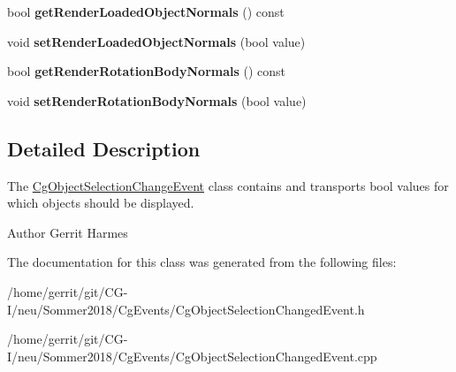\begin{DoxyCompactItemize}
\mbox{\label{class_cg_object_selection_change_event_ae0b775c52f0fb7b1be1d39e6885ac833}} 
bool {\bfseries get\+Render\+Loaded\+Object\+Normals} () const
\item 
\mbox{\label{class_cg_object_selection_change_event_a08680ed931d4d032c71e81939a16e4a6}} 
void {\bfseries set\+Render\+Loaded\+Object\+Normals} (bool value)
\item 
\mbox{\label{class_cg_object_selection_change_event_aadd3ceb647b0df2bf52c4f2b15d4e72c}} 
bool {\bfseries get\+Render\+Rotation\+Body\+Normals} () const
\item 
\mbox{\label{class_cg_object_selection_change_event_afb970c7b54889d6f41c82bd687fbc6fe}} 
void {\bfseries set\+Render\+Rotation\+Body\+Normals} (bool value)
\end{DoxyCompactItemize}


\subsection{Detailed Description}
The \hyperlink{class_cg_object_selection_change_event}{Cg\+Object\+Selection\+Change\+Event} class contains and transports bool values for which objects should be displayed. 

\begin{DoxyAuthor}{Author}
Gerrit Harmes 
\end{DoxyAuthor}


The documentation for this class was generated from the following files\+:\begin{DoxyCompactItemize}
\item 
/home/gerrit/git/\+C\+G-\/\+I/neu/\+Sommer2018/\+Cg\+Events/Cg\+Object\+Selection\+Changed\+Event.\+h\item 
/home/gerrit/git/\+C\+G-\/\+I/neu/\+Sommer2018/\+Cg\+Events/Cg\+Object\+Selection\+Changed\+Event.\+cpp\end{DoxyCompactItemize}
